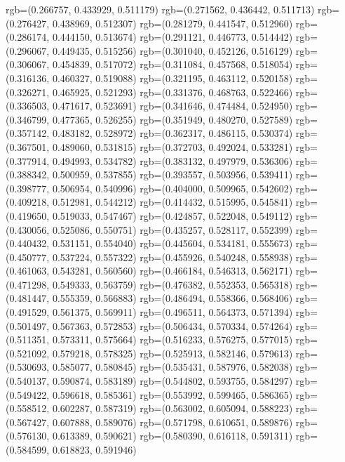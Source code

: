{{{					rgb=(0.266757, 0.433929, 0.511179)
					rgb=(0.271562, 0.436442, 0.511713)
					rgb=(0.276427, 0.438969, 0.512307)
					rgb=(0.281279, 0.441547, 0.512960)
					rgb=(0.286174, 0.444150, 0.513674)
					rgb=(0.291121, 0.446773, 0.514442)
					rgb=(0.296067, 0.449435, 0.515256)
					rgb=(0.301040, 0.452126, 0.516129)
					rgb=(0.306067, 0.454839, 0.517072)
					rgb=(0.311084, 0.457568, 0.518054)
					rgb=(0.316136, 0.460327, 0.519088)
					rgb=(0.321195, 0.463112, 0.520158)
					rgb=(0.326271, 0.465925, 0.521293)
					rgb=(0.331376, 0.468763, 0.522466)
					rgb=(0.336503, 0.471617, 0.523691)
					rgb=(0.341646, 0.474484, 0.524950)
					rgb=(0.346799, 0.477365, 0.526255)
					rgb=(0.351949, 0.480270, 0.527589)
					rgb=(0.357142, 0.483182, 0.528972)
					rgb=(0.362317, 0.486115, 0.530374)
					rgb=(0.367501, 0.489060, 0.531815)
					rgb=(0.372703, 0.492024, 0.533281)
					rgb=(0.377914, 0.494993, 0.534782)
					rgb=(0.383132, 0.497979, 0.536306)
					rgb=(0.388342, 0.500959, 0.537855)
					rgb=(0.393557, 0.503956, 0.539411)
					rgb=(0.398777, 0.506954, 0.540996)
					rgb=(0.404000, 0.509965, 0.542602)
					rgb=(0.409218, 0.512981, 0.544212)
					rgb=(0.414432, 0.515995, 0.545841)
					rgb=(0.419650, 0.519033, 0.547467)
					rgb=(0.424857, 0.522048, 0.549112)
					rgb=(0.430056, 0.525086, 0.550751)
					rgb=(0.435257, 0.528117, 0.552399)
					rgb=(0.440432, 0.531151, 0.554040)
					rgb=(0.445604, 0.534181, 0.555673)
					rgb=(0.450777, 0.537224, 0.557322)
					rgb=(0.455926, 0.540248, 0.558938)
					rgb=(0.461063, 0.543281, 0.560560)
					rgb=(0.466184, 0.546313, 0.562171)
					rgb=(0.471298, 0.549333, 0.563759)
					rgb=(0.476382, 0.552353, 0.565318)
					rgb=(0.481447, 0.555359, 0.566883)
					rgb=(0.486494, 0.558366, 0.568406)
					rgb=(0.491529, 0.561375, 0.569911)
					rgb=(0.496511, 0.564373, 0.571394)
					rgb=(0.501497, 0.567363, 0.572853)
					rgb=(0.506434, 0.570334, 0.574264)
					rgb=(0.511351, 0.573311, 0.575664)
					rgb=(0.516233, 0.576275, 0.577015)
					rgb=(0.521092, 0.579218, 0.578325)
					rgb=(0.525913, 0.582146, 0.579613)
					rgb=(0.530693, 0.585077, 0.580845)
					rgb=(0.535431, 0.587976, 0.582038)
					rgb=(0.540137, 0.590874, 0.583189)
					rgb=(0.544802, 0.593755, 0.584297)
					rgb=(0.549422, 0.596618, 0.585361)
					rgb=(0.553992, 0.599465, 0.586365)
					rgb=(0.558512, 0.602287, 0.587319)
					rgb=(0.563002, 0.605094, 0.588223)
					rgb=(0.567427, 0.607888, 0.589076)
					rgb=(0.571798, 0.610651, 0.589876)
					rgb=(0.576130, 0.613389, 0.590621)
					rgb=(0.580390, 0.616118, 0.591311)
					rgb=(0.584599, 0.618823, 0.591946)
}}}
